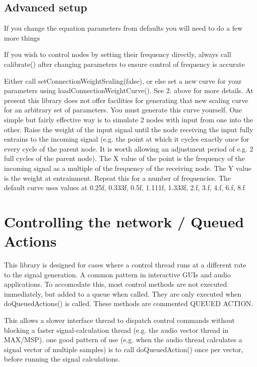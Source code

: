 \subsection*{Advanced setup}

If you change the equation parameters from defaults you will need to do a few more things


\begin{DoxyEnumerate}
\item If you wish to control nodes by setting their frequency directly, always call calibrate() after changing parameters to ensure control of frequency is accurate
\item Either call set\+Connection\+Weight\+Scaling(false), or else set a new curve for your parameters using load\+Connection\+Weight\+Curve(). See 2. above for more details. At present this library does not offer facilities for generating that new scaling curve for an arbitrary set of parameters. You must generate this curve yourself. One simple but fairly effective way is to simulate 2 nodes with input from one into the other. Raise the weight of the input signal until the node receiving the input fully entrains to the incoming signal (e.\+g. the point at which it cycles exactly once for every cycle of the parent node. It is worth allowing an adjustment period of e.\+g. 2 full cycles of the parent node). The X value of the point is the frequency of the incoming signal as a multiple of the frequency of the receiving node. The Y value is the weight at entrainment. Repeat this for a number of frequencies. The default curve uses values at 0.\+25f, 0.\+333f, 0.\+5f, 1.\+111f, 1.\+333f, 2.\+f, 3.\+f, 4.\+f, 6.\+f, 8.\+f
\end{DoxyEnumerate}

\section*{Controlling the network / Queued Actions}

This library is designed for cases where a control thread runs at a different rate to the signal generation. A common pattern in interactive G\+U\+Is and audio applications. To accomodate this, most control methods are not executed immediately, but added to a queue when called. They are only executed when do\+Queued\+Actions() is called. These methods are commented Q\+U\+E\+U\+ED A\+C\+T\+I\+ON.

This allows a slower interface thread to dispatch control commands without blocking a faster signal-\/calculation thread (e.\+g. the audio vector thread in M\+A\+X/\+M\+SP). one good pattern of use (e.\+g. when the audio thread calculates a signal vector of multiple samples) is to call do\+Queued\+Action() once per vector, before running the signal calculations.

